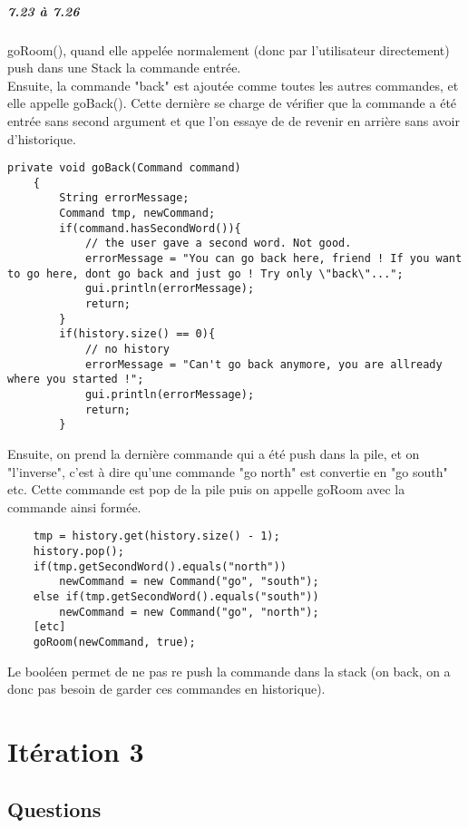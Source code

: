 \documentclass[11pt,a4paper]{report}
\begin{document}
\paragraph{7.23 à  7.26}
goRoom(), quand elle appelée normalement (donc par l'utilisateur directement) push dans une Stack la commande entrée.\\
Ensuite, la commande "back" est ajoutée comme toutes les autres commandes, et elle appelle goBack(). Cette dernière se charge de vérifier que la commande a été entrée sans second argument et que l'on essaye de de revenir en arrière sans avoir d'historique.
\begin{lstlisting}
private void goBack(Command command)
    {
        String errorMessage;
        Command tmp, newCommand;
        if(command.hasSecondWord()){
            // the user gave a second word. Not good.
            errorMessage = "You can go back here, friend ! If you want to go here, dont go back and just go ! Try only \"back\"...";
            gui.println(errorMessage);
            return;
        }
        if(history.size() == 0){
            // no history
            errorMessage = "Can't go back anymore, you are allready where you started !";
            gui.println(errorMessage);
            return;
        }
\end{lstlisting}
Ensuite, on prend la dernière commande qui a été push dans la pile, et on "l'inverse", c'est à dire qu'une commande "go north" est convertie en "go south" etc. Cette commande est pop de la pile puis on appelle goRoom avec la commande ainsi formée.
\begin{lstlisting}
    tmp = history.get(history.size() - 1);
    history.pop();
    if(tmp.getSecondWord().equals("north"))
        newCommand = new Command("go", "south");
    else if(tmp.getSecondWord().equals("south"))
        newCommand = new Command("go", "north");
    [etc]
    goRoom(newCommand, true);
\end{lstlisting}
Le booléen permet de ne pas re push la commande dans la stack (on back, on a donc pas besoin de garder ces commandes en historique).

\chapter{Itération 3}
\section{Questions}
\end{document}
